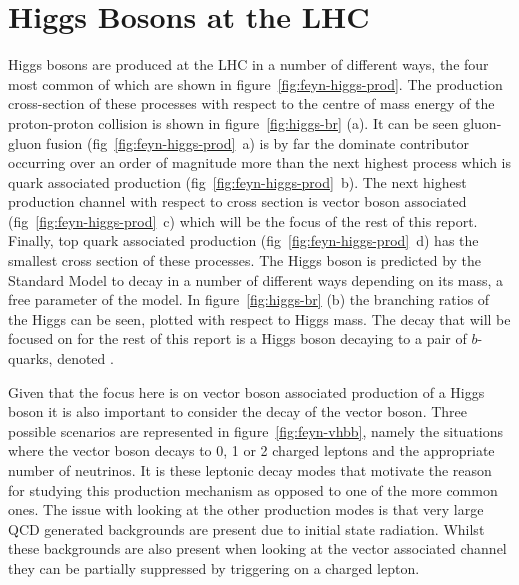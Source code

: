 \section{Higgs Bosons at the LHC}
%
Higgs bosons are produced at the LHC in a number of different ways, the four
most common of which are shown in figure~\ref{fig:feyn-higgs-prod}.
 The production cross-section of these
processes with respect to the centre of mass energy of the proton-proton
collision is shown in figure~\ref{fig:higgs-br} (a). It can be seen gluon-gluon
fusion (fig~\ref{fig:feyn-higgs-prod}~a) is by far the dominate contributor
occurring over an order of magnitude more than the next highest process which is
quark associated production (fig~\ref{fig:feyn-higgs-prod}~b). The next highest
production channel with respect to cross section is vector boson associated
(fig~\ref{fig:feyn-higgs-prod}~c) which will be the focus of the rest of this
report. Finally, top quark associated production
(fig~\ref{fig:feyn-higgs-prod}~d) has the smallest cross section of these
processes. The Higgs boson is predicted by the Standard Model to decay in a
number of different ways depending on its mass, a free parameter of the model.
In figure~\ref{fig:higgs-br} (b) the branching ratios of the Higgs can be seen,
plotted with respect to Higgs mass. The decay that will be focused on for the
rest of this report is a Higgs boson decaying to a pair of $b$-quarks, denoted
\Hbb.

Given that the focus here is on vector boson associated production
of a Higgs boson it is also important to consider the decay of the vector boson.
Three possible scenarios are represented in figure~\ref{fig:feyn-vhbb}, namely
the situations where the vector boson decays to 0, 1 or 2 charged leptons and
the appropriate number of neutrinos.  It is
these leptonic decay modes that motivate the reason for studying this production
mechanism as opposed to one of the more common ones. The issue with looking at
the other production modes is that very large QCD generated backgrounds are
present due to initial state radiation. Whilst these backgrounds are also
present when looking at the vector associated channel they can be partially
suppressed by triggering on a charged lepton.
